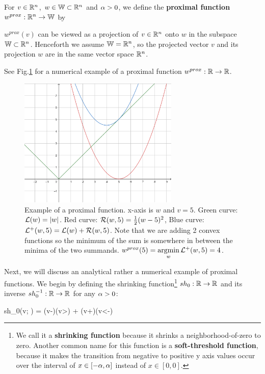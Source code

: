 For $v \in { \mathbb{R}}^n$, $w\in {\mathbb{W}} \subset { \mathbb{R}}^n$
and $\alpha>0$, we define the
{\bf proximal function}
$w^{prox}:{ \mathbb{R}}^n \rightarrow {\mathbb{W}}$ by

\beq
{}
\eeq
$w^{prox}(v)$ can be viewed as a
projection of $v\in{ \mathbb{R}}^n$
onto $w$ in the subspace ${\mathbb{W}}\subset { \mathbb{R}}^n$.
Henceforth we assume ${\mathbb{W}}={ \mathbb{R}}^n$,
so the projected vector $v$ and
its projection $w$ are in the same
vector space ${ \mathbb{R}}^n$.

See Fig.\ref{fig-proximal-example}
for a numerical example of a
proximal function $w^{prox}:{ \mathbb{R}}\rightarrow { \mathbb{R}}$.


\begin{figure}[h!]
\centering
\includegraphics[width=3in]
{regularization/proximal-example.png}
\caption{Example of a proximal
function. x-axis is $w$ and $v=5$. Green curve: ${\cal L}(w)=|w|$. Red curve: ${\cal R}(w, 5)=\frac{1}{2}(w-5)^2$, Blue curve: ${\cal L}^+(w, 5)={\cal L}(w)+{\cal R}(w,5)$. Note that we are adding 2 convex functions so the minimum of the sum is somewhere in between the minima of the two summands.
$w^{prox}(5) =\mathop{\mathrm{argmin}}\limits_w
{\cal L}^+(w, 5)=4$.
}
\label{fig-proximal-example}
\end{figure}

Next, we will discuss an
analytical rather a numerical
example of proximal functions.
We  begin by defining the
shrinking function\footnote{We call it a
{\bf shrinking function} because
it shrinks a neighborhood-of-zero to zero.
Another common name for this function is a
 {\bf soft-threshold function}, because
 it makes the transition from negative to positive y axis values occur over the interval of $x\in [-\alpha, \alpha]$ instead of $x\in [0,0]$.}
 $sh_0: { \mathbb{R}}\rightarrow { \mathbb{R}}$ and its inverse
$sh_0^{-1}:{ \mathbb{R}}\rightarrow{ \mathbb{R}}$  for any $\alpha>0$:

\beq
sh_0(v; \alp) = (v-\alp)\indi(v>\alp) + (v+\alp)\indi(v<-\alp)
\eeq

